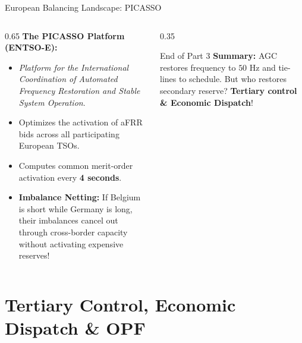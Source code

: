 \begin{frame}{European Balancing Landscape: PICASSO}
\begin{columns}[T]
\begin{column}{0.65\textwidth}
    \footnotesize
    \textbf{The PICASSO Platform (ENTSO-E):}
    \begin{itemize}\setlength{\itemsep}{3pt}
        \item \textit{Platform for the International Coordination of Automated Frequency Restoration and Stable System Operation}.
        \item Optimizes the activation of aFRR bids across all participating European TSOs.
        \item Computes common merit-order activation every \textbf{4 seconds}.
        \item \textbf{Imbalance Netting:} If Belgium is short while Germany is long, their imbalances cancel out through cross-border capacity without activating expensive reserves!
    \end{itemize}
\end{column}
\begin{column}{0.35\textwidth}
    \begin{block}{End of Part 3}
    \scriptsize
    \textbf{Summary:} AGC restores frequency to $50\text{ Hz}$ and tie-lines to schedule. But who restores secondary reserve? \textbf{Tertiary control \& Economic Dispatch}!
    \end{block}
\end{column}
\end{columns}
\end{frame}

\section{Tertiary Control, Economic Dispatch \& OPF}

